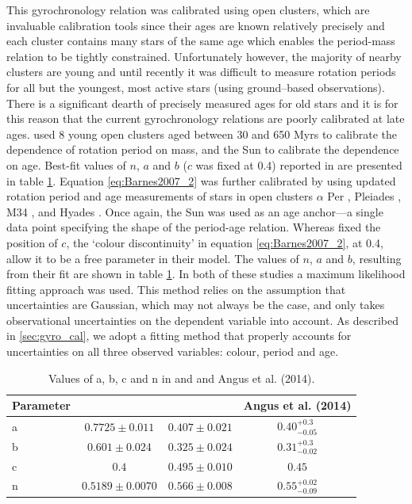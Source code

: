 \documentclass[useAMS, usenatbib]{mn2e}
\newcommand{\gyroa}{0.40}
\newcommand{\aerrp}{0.3}
\newcommand{\aerrm}{0.05}
\newcommand{\gyron}{0.55}
\newcommand{\nerrp}{0.02}
\newcommand{\nerrm}{0.09}
\newcommand{\gyrob}{0.31}
\newcommand{\berrm}{0.02}
\begin{document}
This gyrochronology relation was calibrated using open clusters, which are
invaluable calibration tools since their ages are known relatively precisely
and each cluster contains many stars of the same age which enables the
period-mass relation to be tightly constrained.
Unfortunately however, the majority of nearby clusters are young and until
recently it was difficult to measure rotation periods for all but the
youngest, most active stars (using ground--based observations).
There is a significant dearth of precisely measured ages for old stars and it
is for this reason that the current gyrochronology relations are poorly
calibrated at late ages.
\citet{Barnes2007} used 8 young open clusters aged between 30 and 650 Myrs to
calibrate the dependence of rotation period on mass, and the Sun to calibrate
the dependence on age.
Best-fit values of $n$, $a$ and $b$ ($c$ was fixed at 0.4) reported in
\citet{Barnes2007} are presented in table \ref{tab:constants}.
Equation \ref{eq:Barnes2007_2} was further calibrated by \citet{Mamajek2008}
using updated rotation period and age measurements of stars in open clusters
$\alpha$ Per \citep{Prosser1995}, Pleiades \citep{Prosser1995,
Krishnamurthi1998}, M34 \citep{Meibom2011_M34}, and Hyades \citep[Henry,
private comm.,][]{Radick1987, Radick1995, Prosser1995, Paulson2004}.
Once again, the Sun was used as an age anchor---a single data point specifying
the shape of the period-age relation.
Whereas \citet{Barnes2007} fixed the position of $c$, the `colour
discontinuity' in equation \ref{eq:Barnes2007_2}, at 0.4, \citet{Mamajek2008}
allow it to be a free parameter in their model.
The values of $n$, $a$ and $b$, resulting from their fit are shown in table
\ref{tab:constants}.
In both of these studies a maximum likelihood fitting approach was used.
This method relies on the assumption that uncertainties are Gaussian, which
may not always be the case, and only takes observational uncertainties on the
dependent variable into account.
As described in \textsection \ref{sec:gyro_cal}, we adopt a fitting method
that properly accounts for uncertainties on all three observed variables:
colour, period and age.

\begin{table}
\caption{Values of a, b, c and n in \citet{Barnes2007} and
    \citet{Mamajek2008} and Angus et al. (2014). \label{tab:constants}}
\begin{tabular}{lccc}
\hline\hline
    Parameter & \citet{Barnes2007} & \citet{Mamajek2008} & Angus et al. (2014) \\
    \hline
    a & $0.7725 \pm 0.011$ & $0.407 \pm 0.021$ & $\gyroa^{+\aerrp}_{-\aerrm}$ \\
    b & $0.601 \pm 0.024$ & $0.325 \pm 0.024$ & $\gyrob^{+\aerrp}_{-\berrm}$\\
    c & $0.4$ & $0.495 \pm 0.010$ & $0.45$ \\
    n & $0.5189 \pm 0.0070$ & $0.566 \pm 0.008$ & $\gyron^{+\nerrp}_{-\nerrm}$\\
\hline
\end{tabular}
\end{table}
\end{document}
